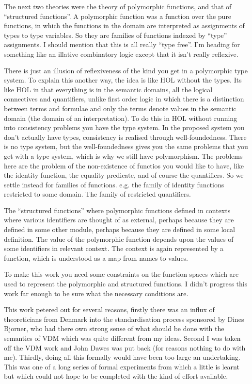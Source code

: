 The next two theories were the theory of polymorphic functions, and that of ``structured functions''.
A polymorphic function was a function over the pure functions, in which the functions in the domain are interpreted as assignments of types to type variables.
So they are families of functions indexed by ``type'' assignments.
I should mention that this is all really ``type free''.
I'm heading for something like an illative combinatory logic except that it isn't really reflexive.

There is just an illusion of reflexiveness of the kind you get in a polymorphic type system.
To explain this another way, the idea is like HOL without the types.
Its like HOL in that everything is in the semantic domains, all the logical connectives and quantifiers, unlike first order logic in which there is a distinction between terms and formulae and only the terms denote values in the semantic domain (the domain of an interpretation).
To do this in HOL without running into consistency problems you have the type system.
In the proposed system you don't actually have types, consistency is realised through well-foundedness.
There is no type system, but the well-foundedness gives you the same problems that you get with a type system, which is why we still have polymorphism.
The problems here are the problem of the non-existence of functios you would like to have, like the identity function, the equality predicate, and of course the quantifiers.
So we settle instead for families of functions.
e.g. the family of identity functions restricted to some domain.
The family of restricted quantifiers.

The ``structured functions'' where polymorphic functions defined in contexts where various identifiers are thought of as external, perhaps because they are defined in some other module, perhaps because they are defined in some local definition.
The value of the polymorphic function depends upon the values of some identifiers in relevant context.
The context is again represented by a function, which is understood as a map from names to values.

To make this work you need some constraints on the function spaces which are used to represent the polymorphic and structured functions.
I didn't progress this work far enough to be sure what the necessary conditions are.

This work petered out for several reasons, firstly there was an influx of theoreticians from Denmark into the standardisation process sponsored by Dines Bjorner, who had there own strong sense of what should be done with the semantics of VDM which was quite different from my ideas.
Second I was taken off the VDM work and John Dawes was put back (for reasons nothing to do with me).
Thirdly, doing all this formally would have been too large an undertaking.
This was one of a long series of formal experiments from which a little is learnt but which could not hope to be completed with the kind of effort available.

